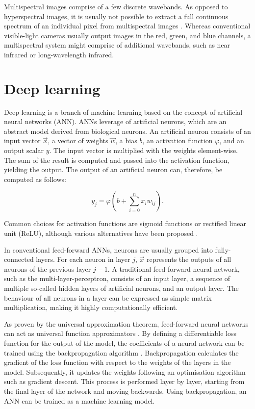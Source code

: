 \documentclass{l4proj}
\begin{document}
Multispectral images comprise of a few discrete wavebands. As opposed to hyperspectral images, it is usually not possible to extract a full continuous spectrum of an individual pixel from multispectral images \citep{abdul_multi-disnet_2019}. Whereas conventional visible-light cameras usually output images in the red, green, and blue channels, a multispectral system might comprise of additional wavebands, such as near infrared or long-wavelength infrared.



\section{Deep learning}

Deep learning is a branch of machine learning based on the concept of artificial neural networks (ANN). ANNs leverage of artificial neurons, which are an abstract model derived from biological neurons. An artificial neuron consists of an input vector $\vec{x}$, a vector of weights $\vec{w}$, a bias $b$, an activation function $\varphi$, and an output scalar $y$. The input vector is multiplied with the weights element-wise. The sum of the result is computed and passed into the activation function, yielding the output. The output of an artificial neuron can, therefore, be computed as follows:

\begin{equation}
  y_j = \varphi (b + \sum_{i=0}^n x_i w_{ij}).
\end{equation}

Common choices for activation functions are sigmoid functions or rectified linear unit (ReLU), although various alternatives have been proposed \citep{ramachandran_searching_2017}.

In conventional feed-forward ANNs, neurons are usually grouped into fully-connected layers. For each neuron in layer $j$, $\vec{x}$ represents the outputs of all neurons of the previous layer $j-1$. A traditional feed-forward neural network, such as the multi-layer-perceptron, consists of an input layer, a sequence of multiple so-called hidden layers of artificial neurons, and an output layer. The behaviour of all neurons in a layer can be expressed as simple matrix multiplication, making it highly computationally efficient.

As proven by the universal approximation theorem, feed-forward neural networks can act as universal function approximators \citep{hornik_approximation_1991}. By defining a differentiable loss function for the output of the model, the coefficients of a neural network can be trained using the backpropagation algorithm \citep{rumelhart_learning_1986}. Backpropagation calculates the gradient of the loss function with respect to the weights of the layers in the model. Subsequently, it updates the weights following an optimisation algorithm such as gradient descent. This process is performed layer by layer, starting from the final layer of the network and moving backwards. Using backpropagation, an ANN can be trained as a machine learning model.
\end{document}
